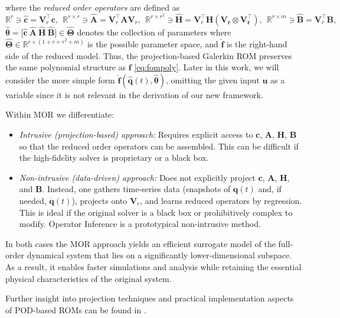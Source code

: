where the \textit{reduced order operators} are defined as\\$$\mathbb{R}^r \ni\hat{\mathbf{c}}=\mathbf{V}_r^{\top}\mathbf{c},~~\mathbb{R}^{r\times r} \ni\hat{\mathbf{A}}=\mathbf{V}_r^{\top}\mathbf{A}\mathbf{V}_r^{},~~\mathbb{R}^{r\times r^2} \ni\hat{\mathbf{H}}=\mathbf{V}_r^{\top}\mathbf{H(\mathbf{V}_r^{}\otimes\mathbf{V}_r^{\top})},~~\mathbb{R}^{r\times m} \ni\hat{\mathbf{B}}=\mathbf{V}_r^{\top}\mathbf{B},$$ $\bm{\hat{\theta}}=\bigl[ \hat{\mathbf{c}}~\hat{\mathbf{A}}~\hat{\mathbf{H}}~\hat{\mathbf{B}} \bigr] \in\bm{\hat{\Theta}}$ denotes the collection of parameters where $\bm{\hat{\Theta}}\in\mathbb{R}^{r\times (1+r+r^2+m)}$ is the possible parameter space, and $\hat{\mathbf{f}}$ is the right-hand side of the reduced model. Thus, the projection-based Galerkin ROM preserves the same polynomial structure as $\mathbf{f}$ \eqref{eq:fompoly}. Later in this work, we will consider the more simple form $\hat{\mathbf{f}}(\hat{\mathbf{q}}(t),\hat{\bm{\theta}})$, omitting the given input $\mathbf{u}$ as a variable since it is not relevant in the derivation of our new framework.

Within MOR we differentiate:
    \begin{itemize}
        \item \emph{Intrusive (projection-based) approach:} Requires explicit access to $\mathbf{c}$, $\mathbf{A}$, $\mathbf{H}$, $\mathbf{B}$ so that the reduced order operators can be assembled. This can be difficult if the high-fidelity solver is proprietary or a black box.
        \item \emph{Non-intrusive (data-driven) approach:} Does not explicitly project $\mathbf{c}$, $\mathbf{A}$, $\mathbf{H}$, and $\mathbf{B}$. Instead, one gathers time-series data (snapshots of $\mathbf{q}(t)$ and, if needed, $\dot{\mathbf{q}}(t)$), projects onto $\mathbf{V}_r$, and learns reduced operators by regression. This is ideal if the original solver is a black box or prohibitively complex to modify. Operator Inference is a prototypical non-intrusive method.
    \end{itemize}

In both cases the MOR approach yields an efficient surrogate model of the full-order dynamical system that lies on a significantly lower-dimensional subspace. As a result, it enables faster simulations and analysis while retaining the essential physical characteristics of the original system. 

Further insight into projection techniques and practical implementation aspects of POD-based ROMs can be found in \cite{opinf2025}.



